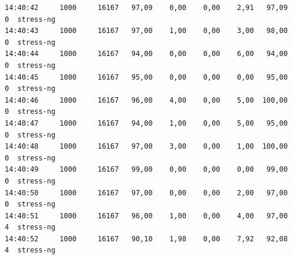 \documentclass[12pt,onecolumn]{article}
\begin{document}
\begin{verbatim}
14:40:42     1000     16167   97,09    0,00    0,00    2,91   97,09     0  stress-ng
14:40:43     1000     16167   97,00    1,00    0,00    3,00   98,00     0  stress-ng
14:40:44     1000     16167   94,00    0,00    0,00    6,00   94,00     0  stress-ng
14:40:45     1000     16167   95,00    0,00    0,00    0,00   95,00     0  stress-ng
14:40:46     1000     16167   96,00    4,00    0,00    5,00  100,00     0  stress-ng
14:40:47     1000     16167   94,00    1,00    0,00    5,00   95,00     0  stress-ng
14:40:48     1000     16167   97,00    3,00    0,00    1,00  100,00     0  stress-ng
14:40:49     1000     16167   99,00    0,00    0,00    0,00   99,00     0  stress-ng
14:40:50     1000     16167   97,00    0,00    0,00    2,00   97,00     0  stress-ng
14:40:51     1000     16167   96,00    1,00    0,00    4,00   97,00     4  stress-ng
14:40:52     1000     16167   90,10    1,98    0,00    7,92   92,08     4  stress-ng


\end{verbatim}
\end{document}
